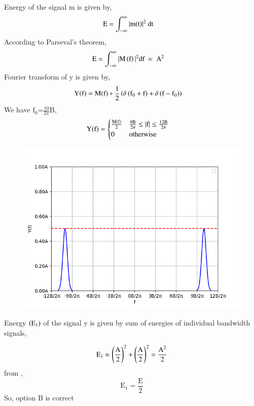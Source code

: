 \documentclass[beamer]{IEEEtran}
\theoremstyle{remark}
\begin{document}
Energy  of the signal m is given by,
\begin{align}
    \text{E}&=\int_{-\infty}^{\infty}|\text{m\brak{\text{t}}}|^2\ \text{dt}
\end{align}
According to Parseval's theorem,
\begin{align}
\label{2}
    \text{E}&=\int_{-\infty}^{\infty}|\text{M}\brak{\text{f}}|^2\text{df}\ \propto\ \text{A}^2
\end{align}
Fourier transform of y is given by,
\begin{align}
\text{Y\ensuremath{\left(\text{f}\right)}}&=\text{M\ensuremath{\left(\text{f}\right)}}*\frac{1}{2}\left(\delta\left(\text{f}_0+\text{f}\right)+\delta\left(\text{f}-\text{f}_0\right)\right)
\end{align}
We have $\text{f}_0$=$\frac{10}{2\pi}$B,
\begin{align}
\text{Y\ensuremath{\left(\text{f}\right)}}&=
\begin{cases}
    \frac{\text{M\ensuremath{\left(\text{f}\right)}}}{2}&\frac{9\text{B}}{2\pi}\leq\left\vert\text{f}\right\vert\leq\frac{12\text{B}}{2\pi}\\
    0 & \text{otherwise}
\end{cases}
\end{align}
\begin{figure}[h]
    \centering
    \includegraphics[scale=0.50]{figs/ec,27(1).png}
    \label{fig:enter-label}
\end{figure}

Energy $\left(\text{E}_1\right)$ of the signal y is given by sum of energies of individual bandwidth signals,

\begin{align}\text{E}_1\propto \left(\frac{\text{A}}{2}\right)^2+\left(\frac{\text{A}}{2}\right)^2=\frac{\text{A}^2}{2}\end{align}
from \brak{\ref{2}},\\
$$\text{E}_1=\frac{\text{E}}{2}$$
So, option B is correct
\end{document}
